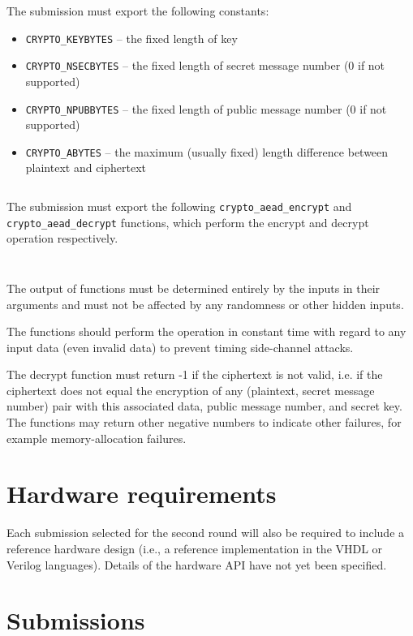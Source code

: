 The submission must export the following constants:

\begin{itemize}
  \item \texttt{CRYPTO\_KEYBYTES} -- the fixed length of key
  \item \texttt{CRYPTO\_NSECBYTES} -- the fixed length of secret message number (0 if not supported)
  \item \texttt{CRYPTO\_NPUBBYTES} -- the fixed length of public message number (0 if not supported)
  \item \texttt{CRYPTO\_ABYTES} -- the maximum (usually fixed) length difference between plaintext and ciphertext
\end{itemize}

\inputminted{c}{code/caesar/constants.c}

The submission must export the following \texttt{crypto\_aead\_encrypt} and \texttt{crypto\_aead\_decrypt} functions, which perform the encrypt and decrypt operation respectively.

\inputminted{c}{code/caesar/encrypt.c}
\inputminted{c}{code/caesar/decrypt.c}

The output of functions must be determined entirely by the inputs in their arguments and must not be affected by any randomness or other hidden inputs.

The functions should perform the operation in constant time with regard to any input data (even invalid data) to prevent timing side-channel attacks.

The decrypt function must return -1 if the ciphertext is not valid, i.e. if the ciphertext does not equal the encryption of any (plaintext, secret message number) pair with this associated data, public message number, and secret key. The functions may return other negative numbers to indicate other failures, for example memory-allocation failures. \cite{crypto-competitions}


\section{Hardware requirements}

Each submission selected for the second round will also be required to include a reference hardware design (i.e., a reference implementation in the VHDL or Verilog languages). Details of the hardware API have not yet been specified. \cite{crypto-competitions}


\section{Submissions}

